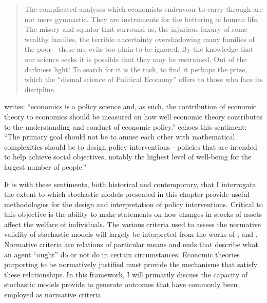 \documentclass[../main.tex]{subfiles}
\begin{document}
\singlespacing
\blockquote{
The complicated analyses which economists endeavour to carry through are not mere gymnastic.
They are instruments for the bettering of human life.
The misery and squalor that surround us, the injurious luxury of some wealthy families, the terrible uncertainty overshadowing many families of the poor - these are evils too plain to be ignored.
By the knowledge that our science seeks it is possible that they may be restrained.
Out of the darkness light!
To search for it is the task, to find it perhaps the prize, which the \enquote{dismal science of Political Economy} offers to those who face its discipline.
}
\doublespacing

\noindent \textcite[238]{Varian1996} writes: \enquote{economics is a policy science and, as such, the contribution of economic theory to economics should be measured on how well economic theory contributes to the understanding and conduct of economic policy.}
\textcite[30]{Leamer2012} echoes this sentiment:
\enquote{The primary goal  should not be to amuse each other with mathematical complexities \textelp{}  should be to design policy interventions - policies that are intended to help achieve social objectives, notably the highest level of well-being for the largest number of people.}{\footnotemark}

\addtocounter{footnote}{-1}

It is with these sentiments, both historical and contemporary, that I interrogate the extent to which stochastic models presented in this chapter provide useful methodologies for the design and interpretation of policy interventions.
Critical to this objective is the ability to make statements on how changes in stocks of assets affect the welfare of individuals.
The various criteria used to assess the normative validity of stochastic models will largely be interpreted from the works of \textcite{Grune-Yanoff2014}, \textcite{Berg2014} and \textcite{Hands2014}.
Normative criteria are relations of particular means and ends that describe what an agent \enquote{ought} do or not do in certain circumstances.
Economic theories purporting to be normatively justified must provide the mechanisms that satisfy these relationships.
In this framework, I will primarily discuss the capacity of stochastic models provide to generate outcomes that have commonly been employed as normative criteria.
\end{document}
